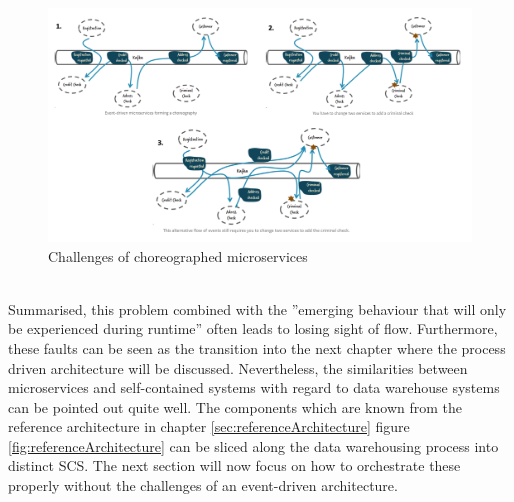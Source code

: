 \begin{figure}[!htb]
    \centering
    \includegraphics[scale=0.33]{pictures/FlowOfEvents.png}
    \caption{Challenges of choreographed microservices \cite{eventDrivenMicroservices}}
    \label{fig:chalengesChoreographedMicroservices}
\end{figure}\\
Summarised, this problem combined with the ''emerging behaviour that will only be experienced during runtime'' \cite{eventDrivenMicroservices} often leads to losing sight of flow.\newline
Furthermore, these faults can be seen as the transition into the next chapter where the process driven architecture will be discussed. Nevertheless, the similarities between microservices and self-contained systems with regard to data warehouse systems can be pointed out quite well. The components which are known from the reference architecture in chapter \ref{sec:referenceArchitecture} figure \ref{fig:referenceArchitecture} can be sliced along the data warehousing process into distinct SCS.\newline
The next section will now focus on how to orchestrate these properly without the challenges of an event-driven architecture. 